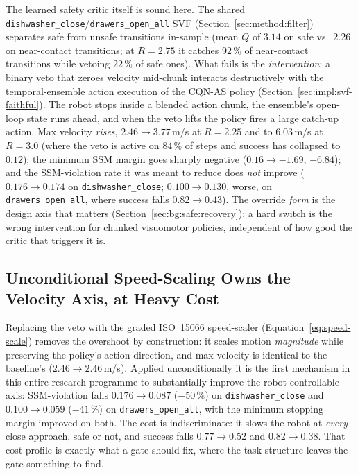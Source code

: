 \documentclass[11pt,a4paper]{report}
\newcommand{\ssm}{SSM}
\newcommand{\iso}{ISO~15066}
\newcommand{\cqnas}{CQN-AS}
\begin{document}
The learned safety critic itself is sound here. The shared
\texttt{dishwasher\_close}/\texttt{drawers\_open\_all} SVF (Section~\ref{sec:method:filter}) separates safe
from unsafe transitions in-sample (mean $Q$ of $3.14$ on safe vs.\
$2.26$ on near-contact transitions; at $R = 2.75$ it catches
$92\,\%$ of near-contact transitions while vetoing $22\,\%$ of safe
ones). What fails is the \emph{intervention}: a binary veto that
zeroes velocity mid-chunk interacts destructively with the
temporal-ensemble action execution of the \cqnas{} policy
(Section~\ref{sec:impl:svf-faithful}). The robot stops inside a
blended action chunk, the ensemble's open-loop state runs ahead, and
when the veto lifts the policy fires a large catch-up action.
Max velocity \emph{rises}, $2.46 \to 3.77$\,m/s at $R = 2.25$ and to
$6.03$\,m/s at $R = 3.0$ (where the veto is active on $84\,\%$ of
steps and success has collapsed to $0.12$); the minimum \ssm{} margin
goes sharply negative ($0.16 \to -1.69$, $-6.84$); and the
\ssm{}-violation rate it was meant to reduce does \emph{not} improve
($0.176 \to 0.174$ on \texttt{dishwasher\_close}; $0.100 \to 0.130$, worse, on
\texttt{drawers\_open\_all}, where success falls $0.82 \to 0.43$). The override
\emph{form} is the design axis that matters
(Section~\ref{sec:bg:safe:recovery}): a hard switch is the wrong
intervention for chunked visuomotor policies, independent of how
good the critic that triggers it is.

\subsection{Unconditional Speed-Scaling Owns the Velocity Axis, at Heavy Cost}
\label{sec:results:r2-uncond}

Replacing the veto with the graded \iso{} speed-scaler
(Equation~\ref{eq:speed-scale}) removes the overshoot by
construction: it scales motion \emph{magnitude} while preserving the
policy's action direction, and max velocity is identical to the
baseline's ($2.46 \to 2.46$\,m/s). Applied unconditionally it is the first
mechanism in this entire research programme to substantially improve
the robot-controllable axis: \ssm{}-violation falls $0.176 \to 0.087$
($-50\,\%$) on \texttt{dishwasher\_close} and $0.100 \to 0.059$ ($-41\,\%$) on
\texttt{drawers\_open\_all}, with the minimum stopping margin improved on both. The cost
is indiscriminate: it slows the robot at \emph{every} close approach,
safe or not, and success falls $0.77 \to 0.52$ and $0.82 \to 0.38$.
That cost profile is exactly what a gate should fix, where the task
structure leaves the gate something to find.
\end{document}

